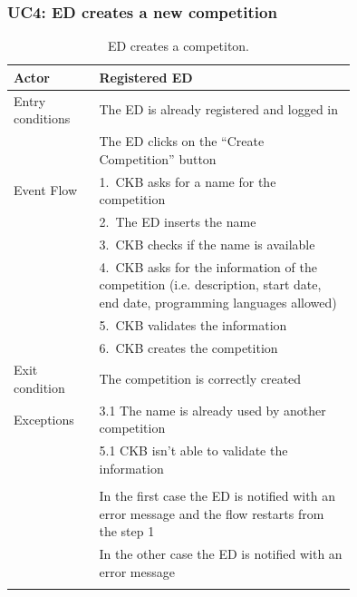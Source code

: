 \subsubsection*{UC4: ED creates a new competition}
\begin{center}
  \begin{longtable}{l|p{0.75\linewidth}}
    \hline
    Actor & Registered ED \\
    \hline
    Entry conditions & The ED is already registered and logged in  \\
    & The ED clicks on the “Create Competition” button \\
    \hline
    Event Flow & 1.\ CKB asks for a name for the competition \\
    & 2.\ The ED inserts the name \\
    & 3.\ CKB checks if the name is available \\
    & 4.\ CKB asks for the information of the competition (i.e. description, start date, end date, programming languages allowed) \\
    & 5.\ CKB validates the information \\
    & 6.\ CKB creates the competition \\
    \hline
    Exit condition & The competition is correctly created \\
    \hline
    Exceptions & 3.1 The name is already used by another competition \\
    & 5.1 CKB isn’t able to validate the information \\ \\
    & In the first case the ED is notified with an error message and the flow restarts from the step 1 \\
    & In the other case the ED is notified with an error message \\
    \hline
    \caption{ED creates a competiton.}
    \label{tab: ED_create_competition}
  \end{longtable}


\end{center}
